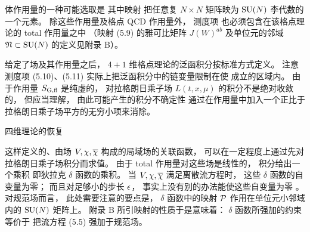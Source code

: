 体作用量的一种可能选取是
其中映射
把任意复 $N\times N$ 矩阵映为 ${\rm SU}(N)$ 李代数的一个元素。
除这些作用量及格点 QCD 作用量外，
测度项
也必须包含在该格点理论的 total 作用量之中
（映射 (5.9) 的雅可比矩阵 $J(W)^{ab}$
及单位元的邻域 $\mathfrak{N}\subset{\rm SU}(N)$ 的定义见附录 B）。

给定了场及其作用量之后，
$4+1$ 维格点理论的泛函积分按标准方式定义。
注意测度项 (5.10)、(5.11)
实际上把泛函积分中的链变量限制在使
成立的区域内。
由于作用量 $S_{\rm G,fl}$ 是纯虚的，
对拉格朗日乘子场 $L(t,x,\mu)$ 的积分不是绝对收敛的，
但应当理解，
由此可能产生的积分不确定性
通过在作用量中加入一个正比于拉格朗日乘子场平方的无穷小项来消除。


 四维理论的恢复

这样定义的、由场 $V,\chi,\overline{\chi}$ 构成的局域场的关联函数，
可以在一定程度上通过先对拉格朗日乘子场积分而求值。
由于 total 作用量对这些场是线性的，
积分给出一个乘积
即狄拉克 $\delta$ 函数的乘积。
当 $V,\chi,\overline{\chi}$ 满足离散流方程时，
这些 $\delta$ 函数的自变量为零；
而且对足够小的步长 $\epsilon$，
事实上没有别的办法能使这些自变量为零%
\kern1pt。
对规范场而言，
此处需要注意的要点是，
$\delta$ 函数中的映射 ${\cal P}$
作用在单位元小邻域内的 ${\rm SU}(N)$ 矩阵上。
附录 B 所引映射的性质于是意味着：
$\delta$ 函数所强加的约束等价于
把流方程 (5.5) 强加于规范场。


